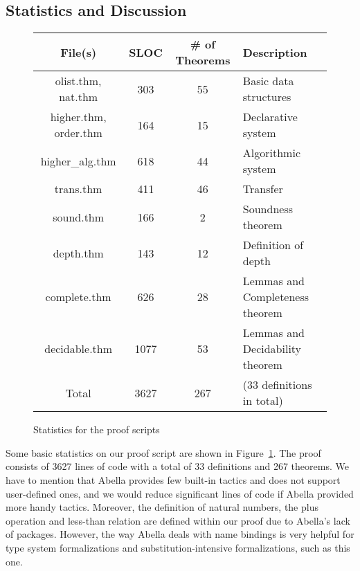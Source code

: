 \subsection{Statistics and Discussion}\label{subsection:discussion}
\begin{figure}[t]
	\centering\begin{tabular}{|c|c|c|l|}\hline
		File(s) & SLOC & \# of Theorems & Description\\\hline
		olist.thm, nat.thm      &  303 & 55  & Basic data structures\\\hline
		higher.thm, order.thm   &  164 & 15  & Declarative system\\\hline
		higher\_alg.thm         &  618 & 44  & Algorithmic system\\\hline
		trans.thm               &  411 & 46  & Transfer\\\hline
		sound.thm               &  166 & 2   & Soundness theorem\\\hline
		depth.thm               &  143 & 12  & Definition of depth\\\hline
		complete.thm            &  626 & 28  & Lemmas and Completeness theorem\\\hline
		decidable.thm           & 1077 & 53  & Lemmas and Decidability theorem\\\hline
		Total                   & 3627 & 267 & (33 definitions in total)\\\hline
	\end{tabular}
	\caption{Statistics for the proof scripts}\label{fig:SLOC}
\end{figure}

Some basic statistics on our proof script are shown in Figure~\ref{fig:SLOC}.
The proof consists of 3627 lines of code with a total of 33 definitions and 267 theorems.
We have to mention that Abella provides few built-in tactics and does not support user-defined ones, and we would reduce significant lines of code if Abella provided more handy tactics.
Moreover, the definition of natural numbers, the plus operation and less-than relation are defined within our proof due to Abella's lack of packages.
However, the way Abella deals with name bindings
is very helpful for type system formalizations and substitution-intensive formalizations, such as this one.
